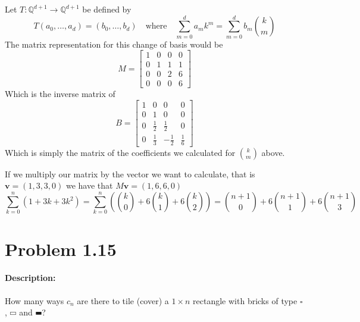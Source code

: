\documentclass[a4paper,notitlepage]{article}
\theoremstyle{plain}
\theoremstyle{definition}
\begin{document}
\begin{enumerate}
        Let $T: \mathbb{Q}^{d+1}\to \mathbb{Q}^{d+1}$ be defined by
        \begin{equation*}
            T(a_0,\dots,a_d) = (b_0,\dots,b_d) \quad \text{where} \quad
            \sum_{m=0}^d a_mk^m = \sum_{m=0}^d b_m\binom{k}{m}
        \end{equation*}
        The matrix representation for this change of basis would be
        \begin{equation*}
            M = \begin{bmatrix}
                1 & 0 & 0 & 0 \\
                0 & 1 & 1 & 1 \\
                0 & 0 & 2 & 6 \\
                0 & 0 & 0 & 6
            \end{bmatrix}
        \end{equation*}
        Which is the inverse matrix of
        \begin{equation*}
            B = \begin{bmatrix}
                1 & 0 & 0 & 0 \\
                0 & 1 & 0 & 0 \\
                0 & \frac{1}{2} & \frac{1}{2} & 0 \\[0.5em]
                0 & \frac{1}{3} & -\frac{1}{2} & \frac{1}{6}
            \end{bmatrix}
        \end{equation*}
        Which is simply the matrix of the coefficients we calculated for $\binom{k}{m}$ above.

        If we multiply our matrix by the vector we want to calculate, that is $\mathbf{v} = (1, 3, 3, 0)$ we have that $M\mathbf{v} = (1, 6, 6, 0)$
        \begin{equation*}
            \sum_{k=0}^n (1+3k+3k^2) = \sum_{k=0}^n \left( \binom{k}{0} + 6\binom{k}{1} + 6\binom{k}{2} \right) = \binom{n+1}{0} + 6\binom{n+1}{1} + 6\binom{n+1}{3}
        \end{equation*}

\end{enumerate}

\section*{Problem 1.15}
\paragraph{Description:}
How many ways $c_n$ are there to tile (cover) a $1\times n$ rectangle with bricks of type $\smwhtsquare$, $\hrectangle$ and $\hrectangleblack$?
\end{document}

